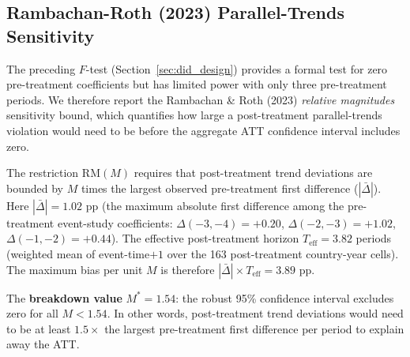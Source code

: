 \documentclass[11pt]{article}
\begin{document}
\subsection{Rambachan-Roth (2023) Parallel-Trends Sensitivity}

The preceding $F$-test (Section~\ref{sec:did_design}) provides a formal test for zero pre-treatment coefficients but has limited power with only three pre-treatment periods. We therefore report the Rambachan \& Roth (2023) \textit{relative magnitudes} sensitivity bound, which quantifies how large a post-treatment parallel-trends violation would need to be before the aggregate ATT confidence interval includes zero.

The restriction $\text{RM}(M)$ requires that post-treatment trend deviations are bounded by $M$ times the largest observed pre-treatment first difference ($|\bar{\Delta}|$). Here $|\bar{\Delta}| = 1.02$ pp (the maximum absolute first difference among the pre-treatment event-study coefficients: $\Delta(-3,-4)=+0.20$, $\Delta(-2,-3)=+1.02$, $\Delta(-1,-2)=+0.44$). The effective post-treatment horizon $T_{\text{eff}} = 3.82$ periods (weighted mean of event-time$+1$ over the 163 post-treatment country-year cells). The maximum bias per unit $M$ is therefore $|\bar{\Delta}| \times T_{\text{eff}} = 3.89$ pp.

The \textbf{breakdown value} $M^* = 1.54$: the robust 95\% confidence interval excludes zero for all $M < 1.54$. In other words, post-treatment trend deviations would need to be at least $1.5\times$ the largest pre-treatment first difference per period to explain away the ATT.
\end{document}
